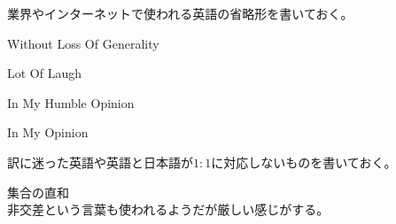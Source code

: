 	業界やインターネットで使われる英語の省略形を書いておく。
	\begin{description}\setlength{\itemsep}{-1mm} %
		\item[WOLOG] Without Loss Of Generality
		\item[LOL] Lot Of Laugh
		\item[IMHO] In My Humble Opinion
		\item[IMO] In My Opinion
	\end{description} %

	訳に迷った英語や英語と日本語が$1:1$に対応しないものを書いておく。
	\begin{description}\setlength{\itemsep}{-1mm} %
		\item[disjoint union] 集合の直和 \\
		非交差という言葉も使われるようだが厳しい感じがする。
	\end{description} %

